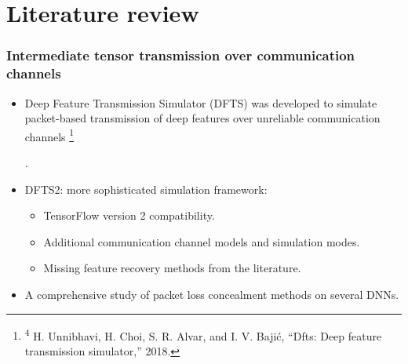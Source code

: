 \documentclass[aspectratio=169]{beamer}
\newcommand\blfootnote[1]{%
	\begingroup
	\renewcommand\thefootnote{}\footnote{#1}%
	\addtocounter{footnote}{-1}%
	\endgroup
}
\begin{document}

\section{Literature review}

\begin{frame}
\frametitle{Intermediate tensor transmission over communication channels}
	\begin{itemize}
	\item Deep Feature Transmission Simulator (DFTS) was developed to simulate packet-based transmission of deep features over unreliable communication channels \blfootnote{\tiny \textsuperscript{4} H. Unnibhavi, H. Choi, S. R. Alvar, and I. V. Bajić, “Dfts: Deep feature transmission simulator,” 2018.} \cite{unnibhavi2018dfts}.
	\item DFTS2: more sophisticated simulation framework:
	\begin{itemize}
	    \item TensorFlow version 2 compatibility.
	    \item Additional communication channel models and simulation modes.
	    \item Missing feature recovery methods from the literature.
	\end{itemize}
	\item A comprehensive study of packet loss concealment methods on several DNNs.
	\end{itemize}
\end{frame}
\end{document}
